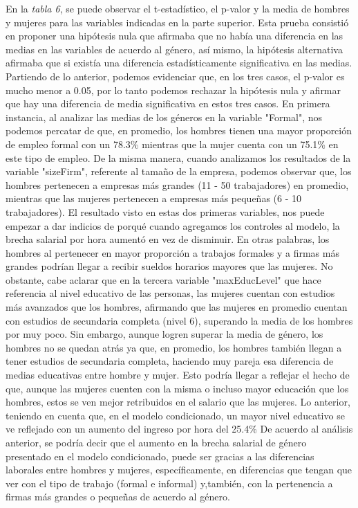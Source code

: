 \documentclass[10pt]{article}
\begin{document}
En la \textit{tabla 6}, se puede observar el t-estadístico, el p-valor y la media de hombres y mujeres para las variables indicadas en la parte superior. Esta prueba consistió en proponer una hipótesis nula que afirmaba que no había una diferencia en las medias en las variables de acuerdo al género, así mismo, la hipótesis alternativa afirmaba que si existía una diferencia estadísticamente significativa en las medias. 
Partiendo de lo anterior, podemos evidenciar que, en los tres casos, el p-valor es mucho menor a 0.05, por lo tanto podemos rechazar la hipótesis nula y afirmar que hay una diferencia de media significativa en estos tres casos. En primera instancia, al analizar las medias de los géneros en la variable "Formal", nos podemos percatar de que, en promedio, los hombres tienen una mayor proporción de empleo formal con un 78.3\% mientras que la mujer cuenta con un 75.1\% en este tipo de empleo. De la misma manera, cuando analizamos los resultados de la variable "sizeFirm", referente al tamaño de la empresa, podemos observar que, los hombres pertenecen a empresas más grandes (11 - 50 trabajadores) en promedio, mientras que las mujeres pertenecen a empresas más pequeñas (6 - 10 trabajadores). El resultado visto en estas dos primeras variables, nos puede empezar a dar indicios de porqué cuando agregamos los controles al modelo, la brecha salarial por hora aumentó en vez de disminuir. En otras palabras, los hombres al pertenecer en mayor proporción a trabajos formales y a firmas más grandes podrían llegar a recibir sueldos horarios mayores que las mujeres. No obstante, cabe aclarar que en la tercera variable "maxEducLevel" que hace referencia al nivel educativo de las personas, las mujeres cuentan con estudios más avanzados que los hombres, afirmando que las mujeres en promedio cuentan con estudios de secundaria completa (nivel 6), superando la media de los hombres por muy poco. Sin embargo, aunque logren superar la media de género, los hombres no se quedan atrás ya que, en promedio, los hombres también llegan a tener estudios de secundaria completa, haciendo muy pareja esa diferencia de medias educativas entre hombre y mujer. Esto podría llegar a reflejar el hecho de que, aunque las mujeres cuenten con la misma o incluso mayor educación que los hombres, estos se ven mejor retribuidos en el salario que las mujeres. Lo anterior, teniendo en cuenta que, en el modelo condicionado, un mayor nivel educativo se ve reflejado con un aumento del ingreso por hora del 25.4\%
De acuerdo al análisis anterior, se podría decir que el aumento en la brecha salarial de género presentado en el modelo condicionado, puede ser gracias a las diferencias laborales entre hombres y mujeres, específicamente, en diferencias que tengan que ver con el tipo de trabajo (formal e informal) y,también, con la pertenencia a firmas más grandes o pequeñas de acuerdo al género. 
\end{document}
